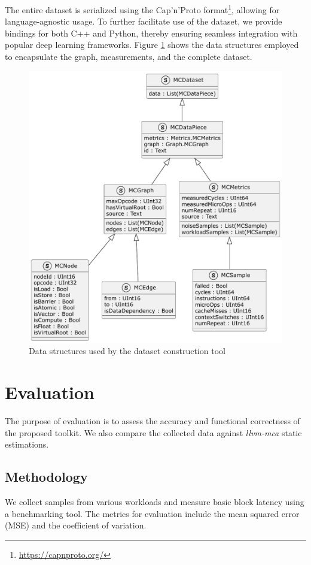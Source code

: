 The entire dataset is serialized using the Cap'n'Proto format\footnote{\url{https://capnproto.org/}},
allowing for language-agnostic usage. To further facilitate use of the dataset, we provide bindings for
both C++ and Python, thereby ensuring seamless integration with popular deep learning frameworks. Figure
\ref{fig:datastruct} shows the data structures employed to encapsulate the graph, measurements, and the
complete dataset.

\begin{figure}[h]
  \centering
  \includegraphics[width=0.9\columnwidth]{data_structures}
  \caption{Data structures used by the dataset construction tool}
  \label{fig:datastruct}
\end{figure}

\section{Evaluation}

The purpose of evaluation is to assess the accuracy and functional correctness of the proposed toolkit.
We also compare the collected data against \textit{llvm-mca} static estimations.

\subsection{Methodology}
We collect samples from various workloads and measure basic block latency using a benchmarking tool.
The metrics for evaluation include the mean squared error (MSE) and the coefficient of variation.

